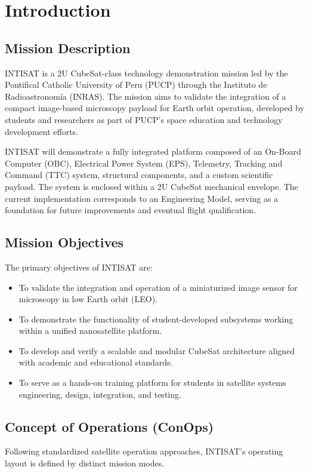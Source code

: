 \chapter{Introduction}
\pagestyle{fancy}

\section{Mission Description}
INTISAT is a 2U CubeSat-class technology demonstration mission led by the Pontifical Catholic University of Peru (PUCP) through the Instituto de Radioastronomía (INRAS). The mission aims to validate the integration of a compact image-based microscopy payload for Earth orbit operation, developed by students and researchers as part of PUCP’s space education and technology development efforts.

INTISAT will demonstrate a fully integrated platform composed of an On-Board Computer (OBC), Electrical Power System (EPS), Telemetry, Tracking and Command (TTC) system, structural components, and a custom scientific payload. The system is enclosed within a 2U CubeSat mechanical envelope. The current implementation corresponds to an Engineering Model, serving as a foundation for future improvements and eventual flight qualification.


\section{Mission Objectives}
The primary objectives of INTISAT are:
\begin{itemize}
    \item To validate the integration and operation of a miniaturized image sensor for microscopy in low Earth orbit (LEO).
    \item To demonstrate the functionality of student-developed subsystems working within a unified nanosatellite platform.
    \item To develop and verify a scalable and modular CubeSat architecture aligned with academic and educational standards.
    \item To serve as a hands-on training platform for students in satellite systems engineering, design, integration, and testing.
\end{itemize}

\section{Concept of Operations (ConOps)}
Following standardized satellite operation approaches, INTISAT's operating layout is defined by distinct mission modes. 

